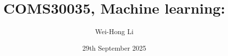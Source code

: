 \usepackage{amsmath, amssymb, graphicx}
\usepackage[]{algorithm2e}
\usepackage{pdfpages}
\usepackage{bm}
\usepackage{relsize}
\usepackage[british]{babel}
\usepackage{tikz,tikzsymbols}
\usepackage{hyperref}
\usepackage{cancel}
\usepackage{caption,subcaption}
\usepackage{adjustbox}
\usepackage{overpic}
\usepackage[UKenglish]{isodate}

\usetikzlibrary{arrows,decorations.markings}

\newcommand{\bs}{\boldsymbol}


\hypersetup{colorlinks,linkcolor=,urlcolor=blue}
\newenvironment{titledslide}[1]{\begin{frame}\frametitle{#1}}{\end{frame}}



\author{Wei-Hong Li}

\title{COMS30035, Machine learning:\\ \vspace{5pt} \lecttitle}

\date{29th September 2025} 



